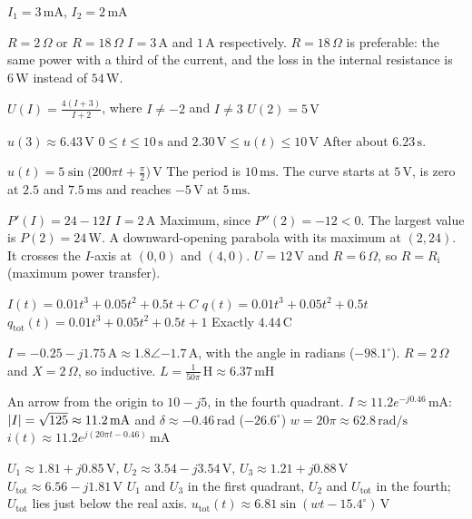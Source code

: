 
\begin{facit}

 $I_1 = 3\,\text{mA}$, $I_2 = 2\,\text{mA}$

  $R = 2\,\Omega$ or $R = 18\,\Omega$
 $I = 3\,\text{A}$ and $1\,\text{A}$ respectively. $R = 18\,\Omega$ is preferable: the same
power with a third of the current, and the loss in the internal resistance is $6\,\text{W}$
instead of $54\,\text{W}$.

  $U(I) = \frac{4(I + 3)}{I + 2}$, where $I \neq -2$ and $I \neq 3$
 $U(2) = 5\,\text{V}$

  $u(3) \approx 6.43\,\text{V}$
 $0 \leq t \leq 10\,\text{s}$ and $2.30\,\text{V} \leq u(t) \leq 10\,\text{V}$
 After about $6.23\,\text{s}$.

  $u(t) = 5\sin\bigl(200\pi t + \frac{\pi}{2}\bigr)\,\text{V}$
 The period is $10\,\text{ms}$. The curve starts at $5\,\text{V}$, is zero at $2.5$ and
$7.5\,\text{ms}$ and reaches $-5\,\text{V}$ at $5\,\text{ms}$.

  $P'(I) = 24 - 12I$  $I = 2\,\text{A}$
 Maximum, since $P''(2) = -12 < 0$.
 The largest value is $P(2) = 24\,\text{W}$.
 A downward-opening parabola with its maximum at $(2, 24)$. It crosses the $I$-axis at
$(0, 0)$ and $(4, 0)$.
 $U = 12\,\text{V}$ and $R = 6\,\Omega$, so $R = R_{\text{i}}$ (maximum power transfer).

  $I(t) = 0.01t^3 + 0.05t^2 + 0.5t + C$
 $q(t) = 0.01t^3 + 0.05t^2 + 0.5t$
 $q_{\text{tot}}(t) = 0.01t^3 + 0.05t^2 + 0.5t + 1$
 Exactly $4.44\,\text{C}$

  $I = -0.25 - j1.75\,\text{A} \approx 1.8\angle{-1.7}\,\text{A}$, with the angle
in radians ($-98.1^{\circ}$).
 $R = 2\,\Omega$ and $X = 2\,\Omega$, so inductive.
 $L = \frac{1}{50\pi}\,\text{H} \approx 6.37\,\text{mH}$

  An arrow from the origin to $10 - j5$, in the fourth quadrant.
 $I \approx 11.2e^{-j0.46}\,\text{mA}$: $\lvert I\rvert = \sqrt{125} \approx 11.2\,\text{mA}$
and $\delta \approx -0.46\,\text{rad}$ ($-26.6^{\circ}$)
 $w = 20\pi \approx 62.8\,\text{rad/s}$
 $i(t) \approx 11.2e^{j(20\pi t - 0.46)}\,\text{mA}$

  $U_1 \approx 1.81 + j0.85\,\text{V}$, $U_2 \approx 3.54 - j3.54\,\text{V}$,
$U_3 \approx 1.21 + j0.88\,\text{V}$
 $U_{\text{tot}} \approx 6.56 - j1.81\,\text{V}$
 $U_1$ and $U_3$ in the first quadrant, $U_2$ and $U_{\text{tot}}$ in the fourth;
$U_{\text{tot}}$ lies just below the real axis.
 $u_{\text{tot}}(t) \approx 6.81\sin(wt - 15.4^{\circ})\,\text{V}$

\end{facit}

